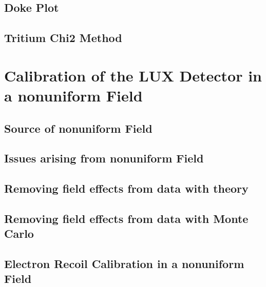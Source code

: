 \documentclass[a4paper,12pt]{article}
\begin{document}
{\subsection{Doke Plot}
\subsection{Tritium Chi2 Method}


\section{Calibration of the LUX Detector in a nonuniform Field} \label{Run04Corrections}


\subsection{Source of nonuniform Field}
\subsection{Issues arising from nonuniform Field}
\subsection{Removing field effects from data with theory}
\subsection{Removing field effects from data with Monte Carlo}
\subsection{Electron Recoil Calibration in a nonuniform Field}


\begin{thebibliography}{1}


\end{thebibliography}}
\end{document}
